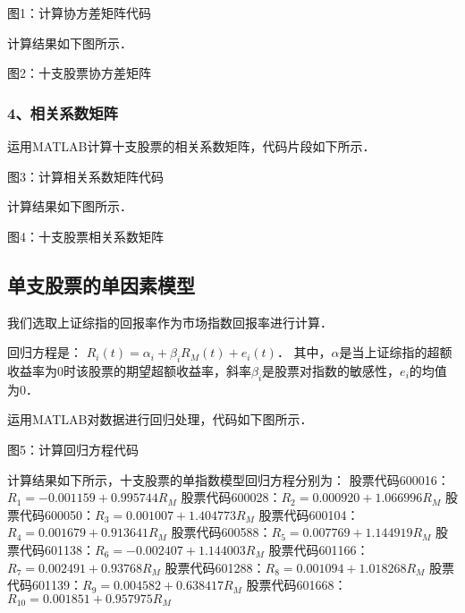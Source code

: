 图1：计算协方差矩阵代码

计算结果如下图所示．

图2：十支股票协方差矩阵

\subsubsection{4、相关系数矩阵}
运用MATLAB计算十支股票的相关系数矩阵，代码片段如下所示．

图3：计算相关系数矩阵代码

计算结果如下图所示．

图4：十支股票相关系数矩阵

\subsection{单支股票的单因素模型}
我们选取上证综指的回报率作为市场指数回报率进行计算．

回归方程是：
$R_{i}(t)=\alpha_{i}+\beta_{i}R_{M}(t)+e_{i}(t)$．
其中，$\alpha$是当上证综指的超额收益率为0时该股票的期望超额收益率，斜率$\beta_{i}$是股票对指数的敏感性，$e_{i}$的均值为0．

运用MATLAB对数据进行回归处理，代码如下图所示．

图5：计算回归方程代码

计算结果如下所示，十支股票的单指数模型回归方程分别为：
股票代码600016：$R_{1}=-0.001159 + 0.995744R_{M}$
股票代码600028：$R_{2}=0.000920 + 1.066996R_{M}$
股票代码600050：$R_{3}=0.001007 + 1.404773R_{M}$
股票代码600104：$R_{4}=0.001679 + 0.913641R_{M}$
股票代码600588：$R_{5}=0.007769 + 1.144919R_{M}$
股票代码601138：$R_{6}=-0.002407 + 1.144003R_{M}$
股票代码601166：$R_{7}=0.002491 + 0.93768R_{M}$
股票代码601288：$R_{8}=0.001094 + 1.018268R_{M}$
股票代码601139：$R_{9}=0.004582+0.638417R_{M}$
股票代码601668：$R_{10}=0.001851+0.957975R_{M}$

